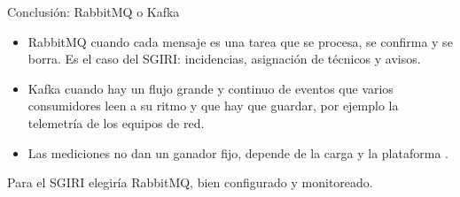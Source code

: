 \begin{frame}{Conclusión: RabbitMQ o Kafka}
  \begin{itemize}
    \item RabbitMQ cuando cada mensaje es una tarea que se procesa, se confirma y se borra. Es el caso del SGIRI: incidencias, asignación de técnicos y avisos.
    \item Kafka cuando hay un flujo grande y continuo de eventos que varios consumidores leen a su ritmo y que hay que guardar, por ejemplo la telemetría de los equipos de red.
    \item Las mediciones no dan un ganador fijo, depende de la carga y la plataforma \cite{rias2026kafka,kaminski2025rabbitmq}.
  \end{itemize}
  \vspace{0.3cm}
  Para el SGIRI elegiría RabbitMQ, bien configurado y monitoreado.
\end{frame}
